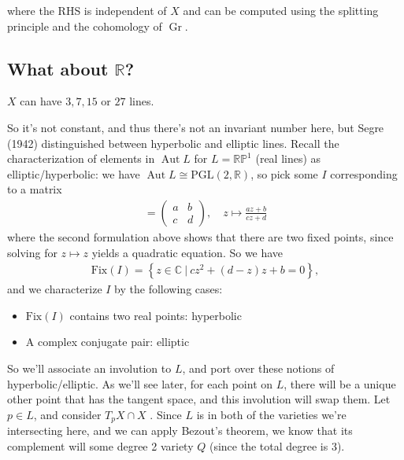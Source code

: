 where the RHS is independent of \(X\) and can be computed using the
splitting principle and the cohomology of \({\operatorname{Gr}}\).

\hypertarget{what-about-mathbbr}{%
\subsection{\texorpdfstring{What about
\({\mathbb{R}}\)?}{What about \{\textbackslash mathbb\{R\}\}?}}\label{what-about-mathbbr}}

\begin{theorem}

\(X\) can have \(3,7,15\) or \(27\) lines.

\end{theorem}

So it's not constant, and thus there's not an invariant number here, but
Segre (1942) distinguished between hyperbolic and elliptic lines. Recall
the characterization of elements in \({\operatorname{Aut}}L\) for
\(L={\mathbb{RP}}^1\) (real lines) as elliptic/hyperbolic: we have
\({\operatorname{Aut}}L \cong \mathrm{PGL}(2, {\mathbb{R}})\), so pick
some \(I\) corresponding to a matrix
\begin{align*}
[I] = \begin{pmatrix}a & b \\ c & d\end{pmatrix},\quad  z\mapsto \frac{az+b}{cz+d}
\end{align*}
where the second formulation above shows that there are two fixed
points, since solving for \(z\mapsto z\) yields a quadratic equation. So
we have
\begin{align*}
\mathrm{Fix}(I) = \left\{{z \in {\mathbb{C}}{~\mathrel{\Big|}~}cz^2 + (d-z)z + b = 0}\right\},
\end{align*}
and we characterize \(I\) by the following cases:

\begin{itemize}
\tightlist
\item
  \(\mathrm{Fix}(I)\) contains two real points: hyperbolic
\item
  A complex conjugate pair: elliptic
\end{itemize}

So we'll associate an involution to \(L\), and port over these notions
of hyperbolic/elliptic. As we'll see later, for each point on \(L\),
there will be a unique other point that has the tangent space, and this
involution will swap them. Let \(p\in L\), and consider \(T_pX \cap X\)
. Since \(L\) is in both of the varieties we're intersecting here, and
we can apply Bezout's theorem, we know that its complement will some
degree 2 variety \(Q\) (since the total degree is 3).

